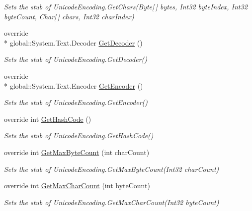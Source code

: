 \begin{DoxyCompactItemize}
\begin{DoxyCompactList}\small\item\em Sets the stub of Unicode\-Encoding.\-Get\-Chars(\-Byte\mbox{[}$\,$\mbox{]} bytes, Int32 byte\-Index, Int32 byte\-Count, Char\mbox{[}$\,$\mbox{]} chars, Int32 char\-Index)\end{DoxyCompactList}\item 
override \\*
global\-::\-System.\-Text.\-Decoder \hyperlink{class_system_1_1_text_1_1_fakes_1_1_stub_unicode_encoding_ade2b07f8870768fd9d66580e13530e16}{Get\-Decoder} ()
\begin{DoxyCompactList}\small\item\em Sets the stub of Unicode\-Encoding.\-Get\-Decoder()\end{DoxyCompactList}\item 
override \\*
global\-::\-System.\-Text.\-Encoder \hyperlink{class_system_1_1_text_1_1_fakes_1_1_stub_unicode_encoding_a55f62d0d67ea7027324be7159d738677}{Get\-Encoder} ()
\begin{DoxyCompactList}\small\item\em Sets the stub of Unicode\-Encoding.\-Get\-Encoder()\end{DoxyCompactList}\item 
override int \hyperlink{class_system_1_1_text_1_1_fakes_1_1_stub_unicode_encoding_a4846d556357c93f587e7b536bc514082}{Get\-Hash\-Code} ()
\begin{DoxyCompactList}\small\item\em Sets the stub of Unicode\-Encoding.\-Get\-Hash\-Code()\end{DoxyCompactList}\item 
override int \hyperlink{class_system_1_1_text_1_1_fakes_1_1_stub_unicode_encoding_a96c8d96963018eff7ed499113f5cbeab}{Get\-Max\-Byte\-Count} (int char\-Count)
\begin{DoxyCompactList}\small\item\em Sets the stub of Unicode\-Encoding.\-Get\-Max\-Byte\-Count(\-Int32 char\-Count)\end{DoxyCompactList}\item 
override int \hyperlink{class_system_1_1_text_1_1_fakes_1_1_stub_unicode_encoding_a41a1fe8c167dc9d833d9cfdeff11696d}{Get\-Max\-Char\-Count} (int byte\-Count)
\begin{DoxyCompactList}\small\item\em Sets the stub of Unicode\-Encoding.\-Get\-Max\-Char\-Count(\-Int32 byte\-Count)\end{DoxyCompactList}\item 

\end{DoxyCompactItemize}
